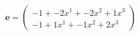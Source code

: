 \documentclass[preview]{standalone}
\begin{document}
\begin{align*}
\mathbf{e} = \begin{pmatrix}-1 + -2x^{1} + -2x^{2} + 1x^{3} \\ -1 + 1x^{1} + -1x^{2} + 2x^{3}\end{pmatrix}
\end{align*}
\end{document}
